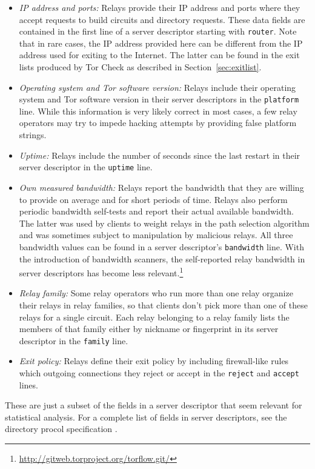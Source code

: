 \documentclass{article}
\begin{document}
\begin{itemize}
\item \textit{IP address and ports:} Relays provide their IP address
and ports where they accept requests to build circuits and directory
requests.
These data fields are contained in the first line of a server descriptor
starting with \verb+router+.
Note that in rare cases, the IP address provided here can be different
from the IP address used for exiting to the Internet.
The latter can be found in the exit lists produced by Tor Check as
described in Section~\ref{sec:exitlist}.
\item \textit{Operating system and Tor software version:} Relays include
their operating system and Tor software version in their server
descriptors in the \verb+platform+ line.
While this information is very likely correct in most cases, a few relay
operators may try to impede hacking attempts by providing false platform
strings.
\item \textit{Uptime:} Relays include the number of seconds since the
last restart in their server descriptor in the \verb+uptime+ line.
\item \textit{Own measured bandwidth:} Relays report the bandwidth that
they are willing to provide on average and for short periods of time.
Relays also perform periodic bandwidth self-tests and report their actual
available bandwidth.
The latter was used by clients to weight relays in the path selection
algorithm and was sometimes subject to manipulation by malicious relays.
All three bandwidth values can be found in a server descriptor's
\verb+bandwidth+ line.
With the introduction of bandwidth scanners, the self-reported relay
bandwidth in server descriptors has become less
relevant.\footnote{\url{http://gitweb.torproject.org/torflow.git/}}
\item \textit{Relay family:} Some relay operators who run more than one
relay organize their relays in relay families, so that clients don't pick
more than one of these relays for a single circuit.
Each relay belonging to a relay family lists the members of that family
either by nickname or fingerprint in its server descriptor in the
\verb+family+ line.
\item \textit{Exit policy:} Relays define their exit policy by including
firewall-like rules which outgoing connections they reject or accept in
the \verb+reject+ and \verb+accept+ lines.
\end{itemize}

These are just a subset of the fields in a server descriptor that seem
relevant for statistical analysis.
For a complete list of fields in server descriptors, see the directory
procol specification \cite{dirspec}.
\end{document}
